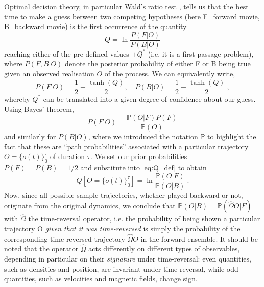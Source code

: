 Optimal decision theory, in particular Wald's ratio test \cite{PhysRevLett.115.250602}, tells us that the best time to make a guess between two competing hypotheses (here F=forward movie, B=backward movie) is the first occurrence of the quantity 
%
\begin{equation}\label{eq:Q_def}
    Q = \ln \frac{P(F|O)}{P(B|O)}
\end{equation}
%
reaching either of the pre-defined values $\pm Q^*$ (i.e. it is a first passage problem),
where $P(F,B|O)$ denote the posterior probability of either F or B being true given an observed realisation $O$ of the process. We can equivalently write,
%
\begin{equation}
    P(F|O) = \frac{1}{2} + \frac{\tanh(Q)}{2},\quad P(B|O) = \frac{1}{2} - \frac{\tanh(Q)}{2}~,
\end{equation}
%
whereby $Q^*$ can be translated into a given degree of confidence about our guess. Using Bayes' theorem,
%
\begin{equation}
    P(F|O) = \frac{\mathbb{P}(O|F)P(F)}{\mathbb{P}(O)}
\end{equation}
%
and similarly for $P(B|O)$,
where we introduced the notation $\mathbb{P}$ to highlight the fact that these are ``path probabilities'' associated with a particular trajectory $O = \{o(t)\}_0^\tau$ of duration $\tau$. We set our prior probabilities $P(F) = P(B) = 1/2$ and substitute into \eqref{eq:Q_def} to obtain
%
\begin{equation}\label{eq:Q_def_paths}
    Q[O = \{o(t)\}_0^\tau] = \ln \frac{\mathbb{P}(O|F)}{\mathbb{P}(O|B)}~.
\end{equation}
%
Now, since all possible sample trajectories, whether played backward or not, originate from the original dynamics, we conclude that $\mathbb{P}(O|B) = \mathbb{P}(\hat{\Omega} O|F)$ with $\hat{\Omega}$ the time-reversal operator, i.e. the probability of being shown a particular trajectory O \emph{given that it was time-reversed} is simply the probability of the corresponding time-reversed trajectory $\hat{\Omega}O$ in the forward ensemble. It should be noted that the operator $\hat{\Omega}$ acts differently on different types of observables, depending in particular on their \emph{signature} under time-reversal: even quantities, such as densities and position, are invariant under time-reversal, while odd quantities, such as velocities and magnetic fields, change sign.\\

